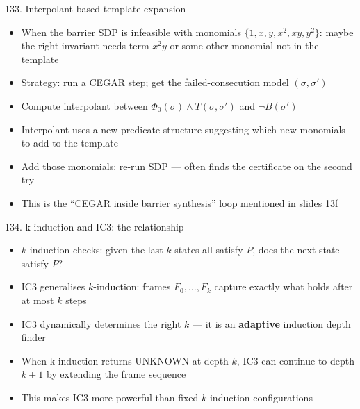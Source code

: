 \documentclass[aspectratio=169]{beamer}
\begin{document}
\begin{frame}{133. Interpolant-based template expansion}
\begin{itemize}
  \item When the barrier SDP is infeasible with monomials \(\{1, x, y, x^2, xy, y^2\}\):
    maybe the right invariant needs term \(x^2 y\) or some other monomial not in the template
  \item Strategy: run a CEGAR step; get the failed-consecution model \((\sigma, \sigma')\)
  \item Compute interpolant between \(\Phi_0(\sigma) \wedge T(\sigma,\sigma')\) and \(\neg B(\sigma')\)
  \item Interpolant uses a new predicate structure suggesting which new monomials to add to the template
  \item Add those monomials; re-run SDP --- often finds the certificate on the second try
  \item This is the ``CEGAR inside barrier synthesis'' loop mentioned in slides 13f
\end{itemize}
\end{frame}

\begin{frame}{134. k-induction and IC3: the relationship}
\begin{itemize}
  \item \(k\)-induction checks: given the last \(k\) states all satisfy \(P\), does the next state satisfy \(P\)?
  \item IC3 generalises \(k\)-induction: frames \(F_0, \ldots, F_k\) capture exactly what holds after at most \(k\) steps
  \item IC3 dynamically determines the right \(k\) --- it is an \textbf{adaptive} induction depth finder
  \item When k-induction returns UNKNOWN at depth \(k\), IC3 can continue to depth \(k+1\) by extending the frame sequence
  \item This makes IC3 more powerful than fixed \(k\)-induction configurations
\end{itemize}
\end{frame}
\end{document}
